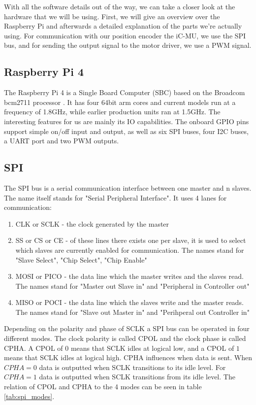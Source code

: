 With all the software details out of the way, we can take a closer look at the hardware that we will be using.
First, we will give an overview over the Raspberry Pi and afterwards a detailed explanation of the parts we're actually using.
For communication with our position encoder the iC-MU, we use the SPI bus, and for sending the output signal to the motor driver, we use a PWM signal.

\subsection{Raspberry Pi 4}
\label{sec:background:hardware:pi}

The Raspberry Pi 4 is a Single Board Computer (SBC) based on the Broadcom bcm2711 processor \cite{bcm2711}.
It has four 64bit arm cores and current models run at a frequency of 1.8GHz, while earlier production units ran at 1.5GHz.
The interesting features for us are mainly its IO capabilities.
The onboard GPIO pins support simple on/off input and output, as well as six SPI buses, four I2C buses, a UART port and two PWM outputs.

\subsection{SPI}
\label{sec:background:hardware:spi}

The SPI bus is a serial communication interface between one master and n slaves.
The name itself stands for "Serial Peripheral Interface".
It uses 4 lanes for communication\cite[p. 220]{SensornetzwerkeInTheorieUndPraxis}:

\begin{enumerate}
    \item CLK or SCLK - the clock generated by the master
    \item SS or CS or CE - of these lines there exists one per slave, it is used to select which slaves are currently enabled for communication. The names stand for "Slave Select", "Chip Select", "Chip Enable"
    \item MOSI or PICO - the data line which the master writes and the slaves read. The names stand for "Master out Slave in" and "Peripheral in Controller out"
    \item MISO or POCI - the data line which the slaves write and the master reads. The names stand for "Slave out Master in" and "Perihperal out Controller in"
\end{enumerate}

Depending on the polarity and phase of SCLK a SPI bus can be operated in four different modes.
The clock polarity is called CPOL and the clock phase is called CPHA.
A CPOL of $0$ means that SCLK idles at logical low, and a CPOL of $1$ means that SCLK idles at logical high.
CPHA influences when data is sent.
When $CPHA = 0$ data is outputted when SCLK transitions to its idle level.
For $CPHA = 1$ data is outputted when SCLK transitions from its idle level.
The relation of CPOL and CPHA to the 4 modes can be seen in table \ref{tab:spi_modes}.

